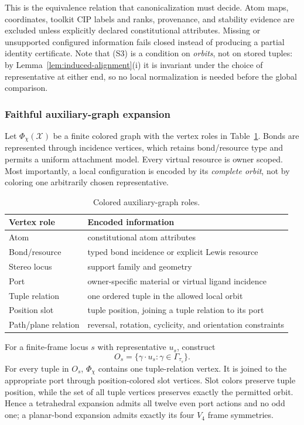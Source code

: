 \documentclass[pdflatex,sn-mathphys-num,referee,lineno]{sn-jnl}
\theoremstyle{plain}
\theoremstyle{remark}
\theoremstyle{definition}
\begin{document}
This is the equivalence relation that canonicalization must decide.  Atom maps,
coordinates, toolkit CIP labels and ranks, provenance, and stability evidence
are excluded unless explicitly declared constitutional attributes.  Missing or
unsupported configured information fails closed instead of producing a partial
identity certificate.  Note that (S3) is a condition on \emph{orbits}, not on
stored tuples: by Lemma~\ref{lem:induced-alignment}(i) it is invariant under
the choice of representative at either end, so no local normalization is needed
before the global comparison.

\subsubsection{Faithful auxiliary-graph expansion}
\label{sec:expansion}

Let \(\Phi_\chi(\mathcal X)\) be a finite colored graph with the vertex roles in
Table~\ref{tab:auxiliary-vertices}.  Bonds are represented through incidence
vertices, which retains bond/resource type and permits a uniform attachment
model.  Every virtual resource is owner scoped.  Most importantly, a local
configuration is encoded by its \emph{complete orbit}, not by coloring one
arbitrarily chosen representative.

\begin{table}[htbp]
\caption{Colored auxiliary-graph roles.}
\label{tab:auxiliary-vertices}
\centering
\begin{tabularx}{\textwidth}{@{}lX@{}}
\toprule
Vertex role & Encoded information \\
\midrule
Atom & constitutional atom attributes \\
Bond/resource & typed bond incidence or explicit Lewis resource \\
Stereo locus & support family and geometry \\
Port & owner-specific material or virtual ligand incidence \\
Tuple relation & one ordered tuple in the allowed local orbit \\
Position slot & tuple position, joining a tuple relation to its port \\
Path/plane relation & reversal, rotation, cyclicity, and orientation constraints \\
\bottomrule
\end{tabularx}
\end{table}

For a finite-frame locus \(s\) with representative \(u_s\), construct
\[
  O_s=\{\gamma\cdot u_s:\gamma\in\Gamma_{\tau_s}\}.
\]
For every tuple in \(O_s\), \(\Phi_\chi\) contains one tuple-relation vertex.  It is
joined to the appropriate port through position-colored slot vertices.  Slot
colors preserve tuple position, while the set of all tuple vertices preserves
exactly the permitted orbit.  Hence a tetrahedral expansion admits all twelve
even port actions and no odd one; a planar-bond expansion admits exactly its
four \(V_4\) frame symmetries.
\end{document}
